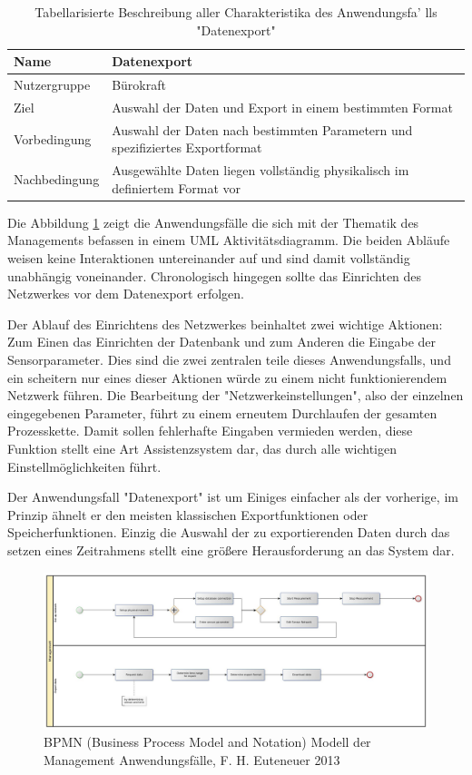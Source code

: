 \begin{table}[H]
\centering
\begin{tabular}{l | p{11cm}}
Name & Datenexport\\ \hline 
Nutzergruppe & Bürokraft\\ \hline 
Ziel & Auswahl der Daten und Export in einem bestimmten Format\\ \hline 
Vorbedingung & Auswahl der Daten nach bestimmten Parametern und spezifiziertes Exportformat\\ \hline 
Nachbedingung & Ausgewählte Daten liegen vollständig physikalisch im definiertem Format vor\\ 
\end{tabular}
\caption{Tabellarisierte Beschreibung aller Charakteristika des Anwendungsfa'
lls "Datenexport"}\label{table:use case description of "Export data"}
\end{table}

Die Abbildung \ref{fig:bpmn_use-case_management} zeigt die Anwendungsfälle die sich mit der Thematik des Managements befassen in einem \gls{UML} Aktivitätsdiagramm. Die beiden Abläufe weisen keine Interaktionen untereinander auf und sind damit vollständig unabhängig voneinander. Chronologisch hingegen sollte das Einrichten des Netzwerkes vor dem Datenexport erfolgen.

Der Ablauf des Einrichtens des Netzwerkes beinhaltet zwei wichtige Aktionen: Zum Einen das Einrichten der Datenbank und zum Anderen die Eingabe der Sensorparameter. Dies sind die zwei zentralen teile dieses Anwendungsfalls, und ein scheitern nur eines dieser Aktionen würde zu einem nicht funktionierendem Netzwerk führen. Die Bearbeitung der "Netzwerkeinstellungen", also der einzelnen eingegebenen Parameter, führt zu einem erneutem Durchlaufen der gesamten Prozesskette. Damit sollen fehlerhafte Eingaben vermieden werden, diese Funktion stellt eine Art Assistenzsystem dar, das durch alle wichtigen Einstellmöglichkeiten führt.

Der Anwendungsfall "Datenexport" ist um Einiges einfacher als der vorherige, im Prinzip ähnelt er den meisten klassischen Exportfunktionen oder Speicherfunktionen. Einzig die Auswahl der zu exportierenden Daten durch das setzen eines Zeitrahmens stellt eine größere Herausforderung an das System dar.

\begin{figure}[H]
	\centering
 	 \includegraphics[scale=0.24]{graphics/bpmn_use-cases_management.jpg} 
	\caption{BPMN (Business Process Model and Notation) Modell der Management Anwendungsfälle, F. H. Euteneuer 2013}
	 \label{fig:bpmn_use-case_management}
\end{figure}


